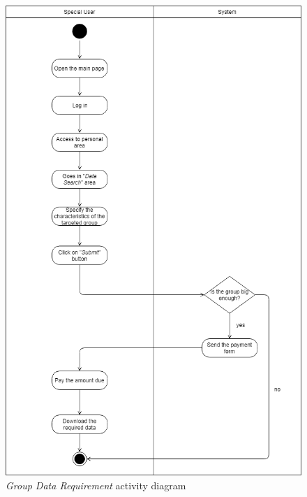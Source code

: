\begin{figure}[H]
\begin{center}
  \includegraphics[height=0.6\paperheight]{img/activity/GroupDataRequirement.png}
  \hspace{0.05\linewidth}
  \centering
  \caption{\textit{Group Data Requirement} activity diagram}
  \label{img:groupDataRequirementActivityDiagram}
\end{center}
\end{figure}
